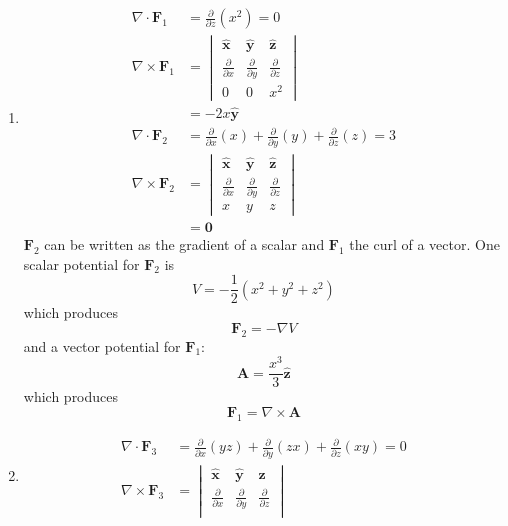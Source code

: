 \documentclass[a4paper]{article}
\begin{document}
\begin{enumerate}[label=(\alph*)]
	\item \begin{align*}
		\nabla \cdot \pmb{F}_{1} & = \frac{\partial }{\partial z}\!\left( x^{2} \right) = 0 \\
		\nabla \times \pmb{F}_{1} & = \begin{vmatrix}
			\pmb{\hat{x}} & \pmb{\hat{y}} & \pmb{\hat{z}} \\
			\frac{\partial }{\partial x} & \frac{\partial }{\partial y} & \frac{\partial }{\partial z} \\
			0 & 0 & x^{2}
		\end{vmatrix} \\
					  & = -2x \pmb{\hat{y}} \\
		\nabla \cdot \pmb{F}_{2} & = \frac{\partial }{\partial x}\!\left( x \right) + \frac{\partial }{\partial y}\!\left( y \right) + \frac{\partial }{\partial z}\!\left( z \right) = 3 \\
		\nabla \times \pmb{F}_{2} & = \begin{vmatrix}
			\pmb{\hat{x}} & \pmb{\hat{y}} & \pmb{\hat{z}} \\
			\frac{\partial }{\partial x} & \frac{\partial }{\partial y} & \frac{\partial }{\partial z} \\
			x & y & z
		\end{vmatrix} \\ 
					  & = \pmb{0}
	\end{align*}
	\( \pmb{F}_{2} \) can be written as the gradient of a scalar and \( \pmb{F}_{1} \) the curl of a vector. One scalar potential for \( \pmb{F}_{2} \) is
	\[
		V = -\frac{1}{2}\!\left( x^{2} + y^{2} + z^{2} \right) 
	\]
	which produces 
	\[
		\pmb{F}_{2} = -\nabla V 
	\]
	and a vector potential for \( \pmb{F}_{1} \):
	\[
		\pmb{A} = \frac{x^{3}}{3}\pmb{\hat{z}} 
	\]
	which produces
	\[
		\pmb{F}_{1} = \nabla \times \pmb{A} 
	\]
	\item \begin{align*}
		\nabla \cdot \pmb{F}_{3} & = \frac{\partial }{\partial x}\!\left( yz \right) + \frac{\partial }{\partial y}\!\left( zx \right) + \frac{\partial }{\partial z}\!\left( xy \right) = 0 \\
		\nabla \times \pmb{F}_{3} & = \begin{vmatrix}
			\pmb{\hat{x}} & \pmb{\hat{y}} & \pmb{\hat{z}} \\
			\frac{\partial }{\partial x} & \frac{\partial }{\partial y} & \frac{\partial }{\partial z} \\

\end{vmatrix}
\end{align*}
\end{enumerate}
\end{document}
